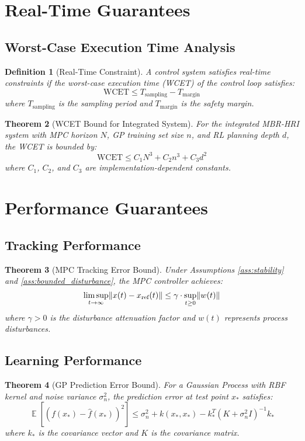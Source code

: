 \documentclass[11pt,twoside]{article}
\newtheorem{theorem}{Theorem}[section]
\newtheorem{definition}[theorem]{Definition}
\DeclareMathOperator{\E}{\mathbb{E}}
\DeclarePairedDelimiter{\norm}{\lVert}{\rVert}
\begin{document}
\section{Real-Time Guarantees}

\subsection{Worst-Case Execution Time Analysis}

\begin{definition}[Real-Time Constraint]
A control system satisfies real-time constraints if the worst-case execution time (WCET) of the control loop satisfies:
$$\text{WCET} \leq T_{\text{sampling}} - T_{\text{margin}}$$
where $T_{\text{sampling}}$ is the sampling period and $T_{\text{margin}}$ is the safety margin.
\end{definition}

\begin{theorem}[WCET Bound for Integrated System]
For the integrated MBR-HRI system with MPC horizon $N$, GP training set size $n$, and RL planning depth $d$, the WCET is bounded by:
$$\text{WCET} \leq C_1 N^3 + C_2 n^3 + C_3 d^2$$
where $C_1$, $C_2$, and $C_3$ are implementation-dependent constants.
\end{theorem}

\section{Performance Guarantees}

\subsection{Tracking Performance}

\begin{theorem}[MPC Tracking Error Bound]
Under Assumptions \ref{ass:stability} and \ref{ass:bounded_disturbance}, the MPC controller achieves:
$$\limsup_{t \to \infty} \norm{x(t) - x_{\text{ref}}(t)} \leq \gamma \cdot \sup_{t \geq 0} \norm{w(t)}$$
where $\gamma > 0$ is the disturbance attenuation factor and $w(t)$ represents process disturbances.
\end{theorem}

\subsection{Learning Performance}

\begin{theorem}[GP Prediction Error Bound]
For a Gaussian Process with RBF kernel and noise variance $\sigma_n^2$, the prediction error at test point $x_*$ satisfies:
$$\E[(f(x_*) - \hat{f}(x_*))^2] \leq \sigma_n^2 + k(x_*, x_*) - k_*^T (K + \sigma_n^2 I)^{-1} k_*$$
where $k_*$ is the covariance vector and $K$ is the covariance matrix.
\end{theorem}
\end{document}
